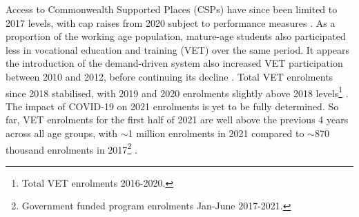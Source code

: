 \documentclass[12pt, a4paper]{article}
\begin{document}
Access to Commonwealth Supported Places (CSPs) have since been limited to 2017 levels, with cap raises from 2020 subject to performance measures \citep{uasystem}. As a proportion of the working age population, mature-age students also participated less in vocational education and training (VET) over the same period. It appears the introduction of the demand-driven system also increased VET participation between 2010 and 2012, before continuing its decline \citep{atkinson2016}. Total VET enrolments since 2018 stabilised, with 2019 and 2020 enrolments slightly above 2018 levels\footnote{Total VET enrolments 2016-2020.} \citep{ncver2021}. The impact of COVID-19 on 2021 enrolments is yet to be fully determined. So far, VET enrolments for the first half of 2021 are well above the previous 4 years across all age groups, with $\sim$1 million enrolments in 2021 compared to $\sim$870 thousand enrolments in 2017\footnote{Government funded program enrolments Jan-June 2017-2021.} \citep{ncver2021}.
\end{document}
